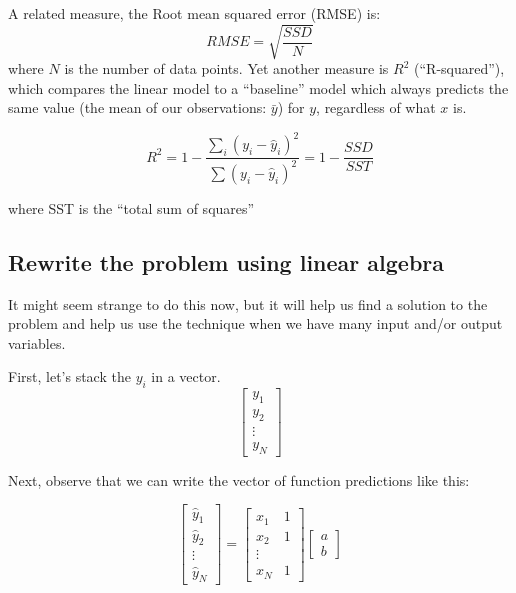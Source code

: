 \documentclass[11pt]{article}
\begin{document}
A related measure, the Root mean squared error (RMSE) is:
\begin{equation}
    RMSE = \sqrt{\frac{SSD}{N}}
\end{equation}
where $N$ is the number of data points.
Yet another measure is $R^2$ (``R-squared''), which compares the linear
model to a ``baseline'' model which always predicts the same value (the
mean of our observations: $\bar{y}$) for $y$, regardless of what $x$ is.  

\begin{equation}
    R^2 = 
        1 - \frac{ \sum_i (y_i - \hat{y}_i)^2 }{ \sum (y_i - \hat{y}_i)^2} = 
        1 - \frac{ SSD }{ SST }
\end{equation}

where SST is the ``total sum of squares''


\subsection{Rewrite the problem using linear algebra}

It might seem strange to do this now, but it will help us find a solution
to the problem and help us use the technique when we have many input
and/or output variables.

First, let's stack the $y_i$ in a vector.
\begin{equation}
    \begin{bmatrix}
        y_1  \\
        y_2 \\
        \vdots \\
        y_N
    \end{bmatrix}
\end{equation}

Next, observe that we can write the vector of function predictions like this:

\begin{equation}
    \begin{bmatrix}
        \hat{y}_1  \\
        \hat{y}_2 \\
        \vdots \\
        \hat{y}_N
    \end{bmatrix}
    = 
    \begin{bmatrix}
        x_1 & 1 \\
        x_2 & 1 \\
        \vdots \\
        x_N & 1
    \end{bmatrix}
    \begin{bmatrix}
        a \\ b
    \end{bmatrix}
\end{equation}
\end{document}
